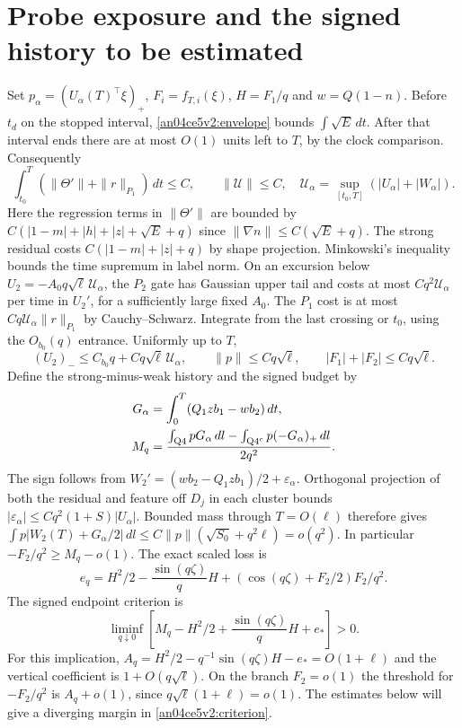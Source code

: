 \documentclass[11pt]{article}
\newcommand{\dd}{\,dl}
\newcommand{\dt}{\,dt}
\begin{document}
\section{Probe exposure and the signed history to be estimated}\label{an04ce5v2:history}
Set $p_\alpha=(U_\alpha(T)^\top\xi)_+$, $F_i=f_{T,i}(\xi)$, $H=F_1/q$ and $w=Q(1-n)$. Before $t_d$ on the stopped interval, \eqref{an04ce5v2:envelope} bounds $\int\sqrt E\dt$. After that interval ends there are at most $O(1)$ units left to $T$, by the clock comparison. Consequently
\[
 \int_{t_0}^T(\|\Theta'\|+\|r\|_{P_1})\dt\le C,\qquad
 \|\mathcal U\|\le C,\quad
 \mathcal U_\alpha=\sup_{[t_0,T]}(|U_\alpha|+|W_\alpha|).
\]
Here the regression terms in $\|\Theta'\|$ are bounded by $C(|1-m|+|h|+|z|+\sqrt E+q)$ since $\|\nabla n\|\le C(\sqrt E+q)$. The strong residual costs $C(|1-m|+|z|+q)$ by shape projection. Minkowski's inequality bounds the time supremum in label norm.
On an excursion below $U_2=-A_0q\sqrt\ell\,\mathcal U_\alpha$, the $P_2$ gate has Gaussian upper tail and costs at most $Cq^2\mathcal U_\alpha$ per time in $U_2'$, for a sufficiently large fixed $A_0$. The $P_1$ cost is at most $Cq\mathcal U_\alpha\|r\|_{P_1}$ by Cauchy--Schwarz. Integrate from the last crossing or $t_0$, using the $O_{b_0}(q)$ entrance. Uniformly up to $T$,
\[
 (U_2)_-\le C_{b_0}q+Cq\sqrt\ell\,\mathcal U_\alpha,\qquad
 \|p\|\le Cq\sqrt\ell,\qquad |F_1|+|F_2|\le Cq\sqrt\ell .
\]
Define the strong-minus-weak history and the signed budget by
\begin{align}
 G_\alpha&=\int_0^T (Q_1 z b_1-w b_2)\dt,\nonumber\\
 M_q&=\frac{\int_{\rm Q4}pG_\alpha\dd-\int_{{\rm Q4}^c}p(-G_\alpha)_+\dd}{2q^2}.
 \label{an04ce5v2:budget}
\end{align}
The sign follows from $W_2'=(w b_2-Q_1zb_1)/2+\varepsilon_\alpha$. Orthogonal projection of both the residual and feature off $D_j$ in each cluster bounds $|\varepsilon_\alpha|\le Cq^2(1+S)|U_\alpha|$. Bounded mass through $T=O(\ell)$ therefore gives
$\int p|W_2(T)+G_\alpha/2|\dd\le C\|p\|(\sqrt{S_0}+q^2\ell)=o(q^2)$.
In particular $-F_2/q^2\ge M_q-o(1)$. The exact scaled loss is
\[
 e_q=H^2/2-\frac{\sin(q\zeta)}q H+
 \left(\cos(q\zeta)+F_2/2\right)F_2/q^2 .
\]
The signed endpoint criterion is
\begin{equation}\label{an04ce5v2:criterion}
 \liminf_{q\downarrow0}\left[M_q-H^2/2+\frac{\sin(q\zeta)}qH+e_*\right]>0 .
\end{equation}
For this implication, $A_q=H^2/2-q^{-1}\sin(q\zeta)H-e_*=O(1+\ell)$ and the vertical coefficient is $1+O(q\sqrt\ell)$. On the branch $F_2=o(1)$ the threshold for $-F_2/q^2$ is $A_q+o(1)$, since $q\sqrt\ell(1+\ell)=o(1)$. The estimates below will give a diverging margin in \eqref{an04ce5v2:criterion}.
\end{document}
